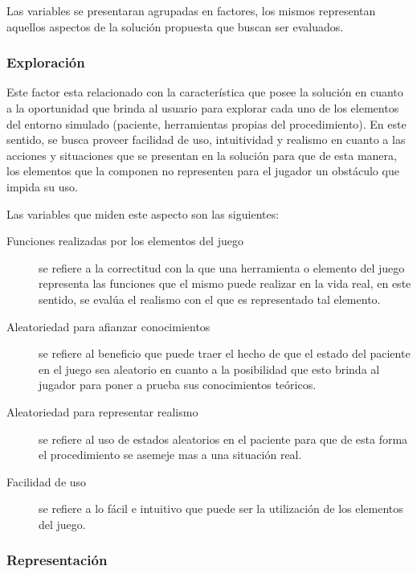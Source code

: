 Las variables se presentaran agrupadas en factores, los mismos representan
aquellos aspectos de la solución propuesta que buscan ser evaluados.

\subsubsection{Exploración}
\label{sec:sub_exploracion}

Este factor esta relacionado con la característica que posee la solución en
cuanto a la oportunidad que brinda al usuario para explorar cada uno de los
elementos del entorno simulado (paciente, herramientas propias del
procedimiento). En este sentido, se busca proveer facilidad de uso, intuitividad
y realismo en cuanto a las acciones y situaciones que se presentan en la
solución para que de esta manera, los elementos que la componen no representen
para el jugador un obstáculo que impida su uso.

Las variables que miden este aspecto son las siguientes:

\begin{description}

\item[Funciones realizadas por los elementos del juego] se refiere a la
    correctitud con la que una herramienta o elemento del juego representa las
    funciones que el mismo puede realizar en la vida real, en este sentido, se
    evalúa el realismo con el que es representado tal elemento.

\item[Aleatoriedad para afianzar conocimientos] se refiere al beneficio que
    puede traer el hecho de que el estado del paciente en el juego sea aleatorio
    en cuanto a la posibilidad que esto brinda al jugador para poner a prueba
    sus conocimientos teóricos.

\item[Aleatoriedad para representar realismo] se refiere al uso de estados
    aleatorios en el paciente para que de esta forma el procedimiento se asemeje
    mas a una situación real.

\item[Facilidad de uso] se refiere a lo fácil e intuitivo  que puede ser la
    utilización de los elementos del juego.

\end{description}

\subsubsection{Representación}
\label{sec:sub_representacion}


